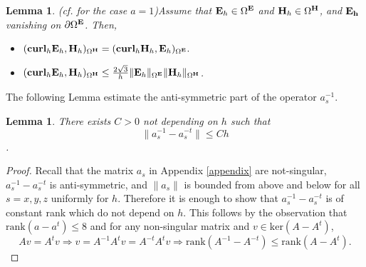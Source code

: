 \documentclass[12pt,reqno]{amsart}
\newcommand{\curl}{{\bf curl}}
\newcommand{\e}{{\bf E}}
\newcommand{\h}{{\bf H}}
\newcommand{\p}{{\bf P}}
\newtheorem{lem}[theorem]{Lemma}
\newtheorem{lemma}[theorem]{Lemma}
\newtheorem{defi}[theorem]{Definition}
\theoremstyle{definition}
\numberwithin{equation}{section}
\def\Gw{\Omega}     \def\Gx{\Xi}         \def\Gy{\Psi}
\begin{document}
\begin{lemma}(cf. \cite[(37)]{sakka} for the case $a=1$)\label{lem:sym}
	Assume that $\e_h\in \Gw^\e$ and $\h_h\in \Gw^\h$, and
	$\bf{E}_h$ vanishing on $\partial \Gw^{\bf{E}}$. Then,
	\begin{itemize}
		\item  
		$
		(\curl_h\e_h,\h_h)_{\Gw^\h}=
		(\curl_h\h_h,\e_h)_{\Gw^\e}.
		$\\[1mm]
		\item $(\curl _h\e_h,\h_h)_{\Gw^\h}\leq
		  \frac{2\sqrt{3}}{h}\|\e_h\|_{\Gw^\e}
		\|\h_h\|_{\Gw^\h}
		$.

	\end{itemize}

\end{lemma}
%    
The following Lemma estimate the anti-symmetric part of the operator $a_s^{-1}$.
\begin{lem}\label{lem:antiestimates}
	There exists $C>0$ not depending on $h$ such that $$\|a_s^{-1}-a_s^{-t}\|\leq Ch$$.
\end{lem}
\begin{proof}
	Recall that the matrix  $a_s $ in Appendix \ref{appendix} are not-singular,  $a_s^{-1}-a_s^{-t}$ is anti-symmetric, and $\|a_s\|$ is bounded from above and below for all $s=x,y,z$ uniformly for $h$. Therefore it is enough to show that $a_s^{-1}-a_s^{-t}$ is of constant rank which do not depend on $h$. This follows  by the observation that 
	$\mathrm{rank}(a-a^t)\leq 8$ and for any non-singular matrix and $v\in \mathrm{ker}(A-A^t)$,
	$$
	Av=A^tv \Rightarrow v=A^{-1}A^{t}v=A^{-t}A^{t}v\Rightarrow
	\mathrm{rank}(A^{-1}-A^{-t})\leq 	\mathrm{rank}(A-A^t).
	$$
\end{proof}
\end{document}
